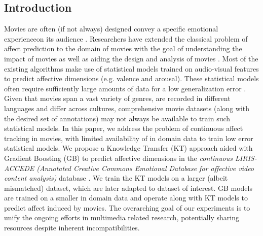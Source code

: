 \documentclass{article}
\begin{document}
\begin{spacing}{0.9}
\section{Introduction}
\vspace{-2mm}
\label{sec:intro}
Movies are often (if not always) designed convey a specific emotional experienceon its audience \cite{bartsch2012emotional, canini2009emotional}.
Researchers have extended the classical problem of affect prediction to the domain of movies with the goal of understanding the impact of movies as well as aiding the design and analysis of movies \cite{giannakopoulos2009dimensional, jiang2014predicting}. 
Most of the existing algorithms make use of statistical models trained on audio-visual features to predict affective dimensions (e.g. valence and arousal).  
These statistical models often require sufficiently large amounts of data for a low generalization error \cite{vapnik1998statistical}.
Given that movies span a vast variety of genres, are recorded in different languages and differ across cultures, comprehensive movie datasets (along with the desired set of annotations) may not always be available to train such statistical models. 
In this paper, we address the problem of continuous affect tracking in movies, with limited availability of in domain data to train low error statistical models. 
We propose a Knowledge Transfer (KT) approach aided with Gradient Boosting (GB) to predict affective dimensions in the {\it continuous LIRIS-ACCEDE (Annotated Creative Commons Emotional Database for affective video content analysis)} database \cite{baveye2015liris}.
We train the KT models on a larger (albeit mismatched) dataset, which are later adapted to dataset of interest. 
GB models are trained on a smaller in domain data and operate along with KT models to predict affect induced by movies.
The overarching goal of our experiments is to unify the ongoing efforts in multimedia related research, potentially sharing resources despite inherent incompatibilities. 


\end{spacing}
\end{document}

